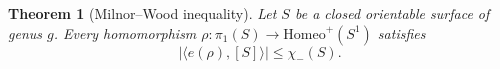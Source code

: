 \documentclass[11pt]{amsart}
\newtheorem{thm}{Theorem}[section]
\theoremstyle{remark}
\theoremstyle{definition}
\begin{document}
\begin{thm}[Milnor--Wood inequality]
	Let $S$ be a closed orientable surface of genus $g$. Every homomorphism $\rho \colon \pi_1(S) \rightarrow \mathrm{Homeo}^+(S^1)$ satisfies 
	\[  |\langle e(\rho) , [S] \rangle | \leq \chi_-(S). \]
\end{thm}

%	
\end{document}
